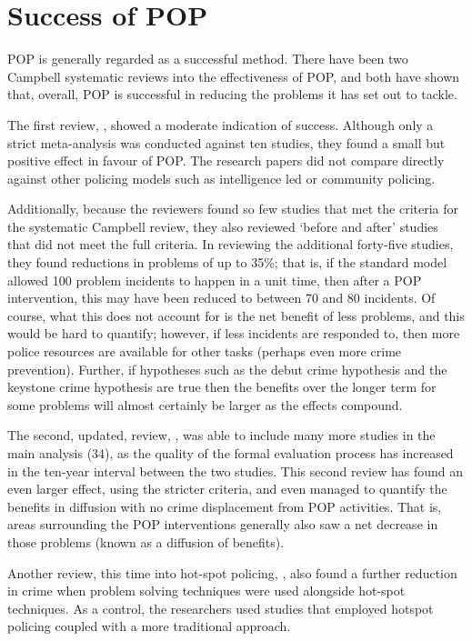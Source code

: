 \section{Success of POP} POP is generally regarded as a successful method. There have been two Campbell systematic reviews into the effectiveness of POP, and both have shown that, overall, POP is successful in reducing the problems it has set out to tackle. 

The first review, \parencite{popeffective}, showed a moderate indication of success. Although only a strict meta-analysis was conducted against ten studies, they found a small but positive effect in favour of POP. The research papers did not compare directly against other policing models such as intelligence led or community policing.

Additionally, because the reviewers found so few studies that met the criteria for the systematic Campbell review, they also reviewed ‘before and after’ studies that did not meet the full criteria. In reviewing the additional forty-five  studies, they found reductions in problems of up to 35\%; that is, if the standard model allowed 100 problem incidents to happen in a unit time, then after a POP intervention, this may have been reduced to between 70 and 80 incidents. Of course, what this does not account for is the net benefit of less problems, and this would be hard to quantify; however, if less incidents are responded to, then more police resources are available for other tasks (perhaps even more crime prevention). Further, if hypotheses such as the debut crime hypothesis and the keystone crime hypothesis  \parencite{farrell2015debuts} are true then the benefits over the longer term for some problems will almost certainly be larger as the effects compound. 

The second, updated, review,  \parencite{hinkle2020problem}, was able to include many more studies in the main analysis (34), as the quality of the formal evaluation process has increased in the ten-year interval between the two studies. This second review has found an even larger effect, using the stricter criteria, and even managed to quantify the benefits in diffusion with no crime displacement from POP activities. That is, areas surrounding the POP interventions generally also saw a net decrease in those problems (known as a diffusion of benefits).

Another review, this time into hot-spot policing, \parencite{braga2014effects}, also found a further reduction in crime when problem solving techniques were used alongside hot-spot techniques. As a control, the researchers used studies that employed hotspot policing coupled with a more traditional approach.

